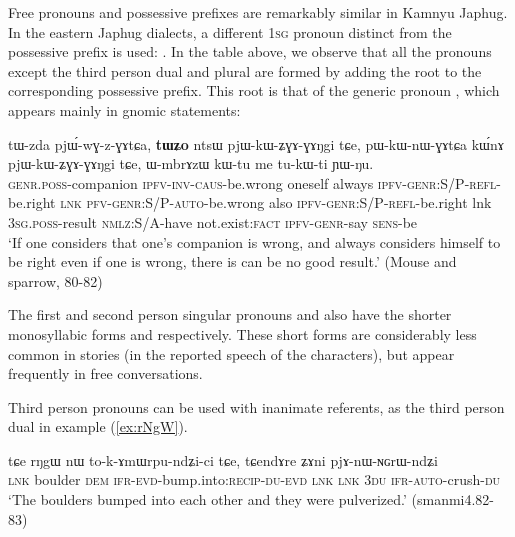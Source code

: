 Free pronouns and possessive prefixes are remarkably similar in Kamnyu Japhug. In the eastern Japhug dialects, a different \textsc{1sg} pronoun distinct from the possessive prefix  is used: . In the table above, we observe that all the pronouns except the third person dual and plural are formed by adding the root  to the corresponding possessive prefix. This root is that of the generic pronoun , which appears mainly in gnomic statements:


\begin{exe}
\ex
\gll 
tɯ-zda pjɯ́-wɣ-z-ɣɤtɕa, \textbf{tɯʑo}  ntsɯ  pjɯ-kɯ-ʑɣɤ-ɣɤŋgi   	tɕe,  pɯ-kɯ-nɯ-ɣɤtɕa 	kɯ́nɤ   	pjɯ-kɯ-ʑɣɤ-ɣɤŋgi   	tɕe,    ɯ-mbrɤzɯ   	kɯ-tu   	me  	tu-kɯ-ti   	ɲɯ-ŋu.   \\
\textsc{genr.poss}-companion \textsc{ipfv-inv-caus}-be.wrong oneself always \textsc{ipfv-genr:S/P-refl}-be.right \textsc{lnk} \textsc{pfv-genr:S/P-auto}-be.wrong also \textsc{ipfv-genr:S/P-refl}-be.right lnk \textsc{3sg.poss}-result \textsc{nmlz:S/A}-have  not.exist:\textsc{fact} \textsc{ipfv-genr}-say \textsc{sens}-be \\
\glt  `If one considers that one's companion is wrong, and always considers himself to be right even if one is wrong, there is can be no good result.' (Mouse and sparrow, 80-82)
\end{exe} 


The first and second person singular pronouns   and  also have the shorter monosyllabic forms  and  respectively. These short forms are considerably less common in stories (in the reported speech of the characters), but appear frequently in free conversations.


Third person pronouns can be used with inanimate referents, as the third person dual  in example (\ref{ex:rNgW}).

\begin{exe}
\ex \label{ex:rNgW}
\gll tɕe   	rŋgɯ   	nɯ   	to-k-ɤmɯrpu-ndʑi-ci   	tɕe,   	tɕendɤre   	ʑɤni   	pjɤ-nɯ-ɴɢrɯ-ndʑi   \\
\textsc{lnk} boulder \textsc{dem} \textsc{ifr-evd}-bump.into:\textsc{recip}-\textsc{du-evd} \textsc{lnk} \textsc{lnk} \textsc{3du} \textsc{ifr-auto}-crush-\textsc{du} \\
\glt `The boulders bumped into each other and they were pulverized.' (smanmi4.82-83)
\end{exe}





